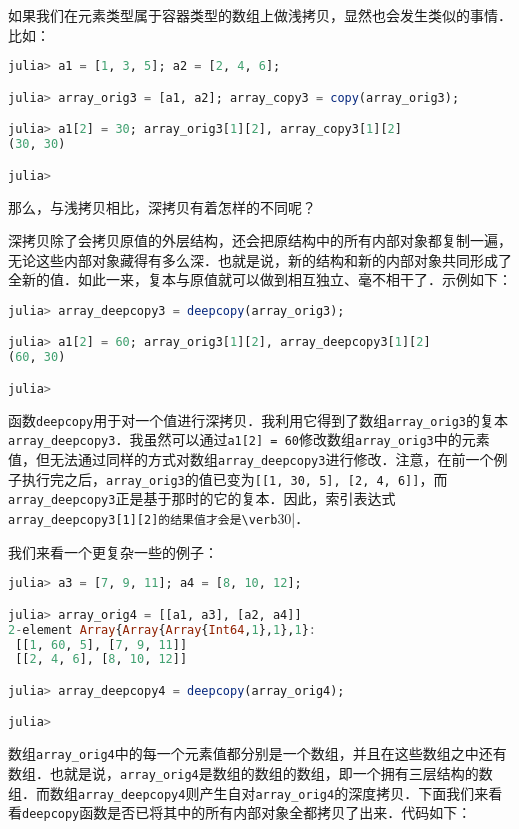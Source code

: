 如果我们在元素类型属于容器类型的数组上做浅拷贝，显然也会发生类似的事情．比如：

\begin{lstlisting}[language=julia]
julia> a1 = [1, 3, 5]; a2 = [2, 4, 6];

julia> array_orig3 = [a1, a2]; array_copy3 = copy(array_orig3);

julia> a1[2] = 30; array_orig3[1][2], array_copy3[1][2]
(30, 30)

julia> 
\end{lstlisting}

那么，与浅拷贝相比，深拷贝有着怎样的不同呢？

深拷贝除了会拷贝原值的外层结构，还会把原结构中的所有内部对象都复制一遍，无论这些内部对象藏得有多么深．也就是说，新的结构和新的内部对象共同形成了全新的值．如此一来，复本与原值就可以做到相互独立、毫不相干了．示例如下：

\begin{lstlisting}[language=julia]
julia> array_deepcopy3 = deepcopy(array_orig3);

julia> a1[2] = 60; array_orig3[1][2], array_deepcopy3[1][2]
(60, 30)

julia> 
\end{lstlisting}

函数\verb|deepcopy|用于对一个值进行深拷贝．我利用它得到了数组\verb|array_orig3|的复本\verb|array_deepcopy3|．我虽然可以通过\verb|a1[2] = 60|修改数组\verb|array_orig3|中的元素值，但无法通过同样的方式对数组\verb|array_deepcopy3|进行修改．注意，在前一个例子执行完之后，\verb|array_orig3|的值已变为\verb|[[1, 30, 5], [2, 4, 6]]|，而\verb|array_deepcopy3|正是基于那时的它的复本．因此，索引表达式\verb|array_deepcopy3[1][2]的结果值才会是\verb|30|．

我们来看一个更复杂一些的例子：

\begin{lstlisting}[language=julia]
julia> a3 = [7, 9, 11]; a4 = [8, 10, 12];

julia> array_orig4 = [[a1, a3], [a2, a4]]
2-element Array{Array{Array{Int64,1},1},1}:
 [[1, 60, 5], [7, 9, 11]]
 [[2, 4, 6], [8, 10, 12]]

julia> array_deepcopy4 = deepcopy(array_orig4);

julia> 
\end{lstlisting}

数组\verb|array_orig4|中的每一个元素值都分别是一个数组，并且在这些数组之中还有数组．也就是说，\verb|array_orig4|是数组的数组的数组，即一个拥有三层结构的数组．而数组\verb|array_deepcopy4|则产生自对\verb|array_orig4|的深度拷贝．下面我们来看看\verb|deepcopy|函数是否已将其中的所有内部对象全都拷贝了出来．代码如下：

